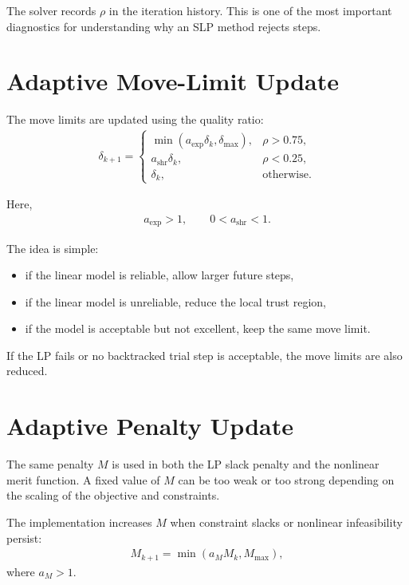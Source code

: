 \documentclass[11pt,a4paper]{article}
\begin{document}
The solver records \(\rho\) in the iteration history. This is one of the most
important diagnostics for understanding why an SLP method rejects steps.

\section{Adaptive Move-Limit Update}

The move limits are updated using the quality ratio:
\begin{align}
    \delta_{k+1}
    =
    \begin{cases}
        \min(a_{\text{exp}}\delta_k, \delta_{\max}),
        & \rho > 0.75, \\
        a_{\text{shr}}\delta_k,
        & \rho < 0.25, \\
        \delta_k,
        & \text{otherwise}.
    \end{cases}
\end{align}

Here,
\begin{align}
    a_{\text{exp}} > 1, \qquad 0 < a_{\text{shr}} < 1.
\end{align}

The idea is simple:
\begin{itemize}[nosep]
    \item if the linear model is reliable, allow larger future steps,
    \item if the linear model is unreliable, reduce the local trust region,
    \item if the model is acceptable but not excellent, keep the same move limit.
\end{itemize}

If the LP fails or no backtracked trial step is acceptable, the move limits are
also reduced.

\section{Adaptive Penalty Update}

The same penalty \(M\) is used in both the LP slack penalty and the nonlinear
merit function. A fixed value of \(M\) can be too weak or too strong depending
on the scaling of the objective and constraints.

The implementation increases \(M\) when constraint slacks or nonlinear
infeasibility persist:
\begin{align}
    M_{k+1} = \min(a_M M_k, M_{\max}),
\end{align}
where \(a_M > 1\).
\end{document}
